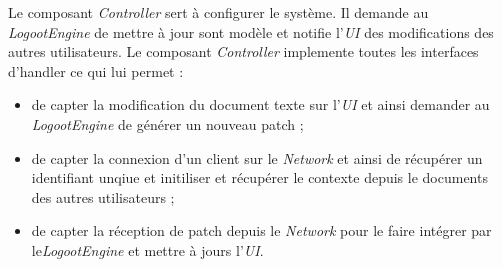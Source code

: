   Le composant \emph{Controller} sert à configurer le système. Il demande
  au \emph{LogootEngine} de mettre à jour sont modèle et notifie l'\emph{UI} des
  modifications des autres utilisateurs. Le composant \emph{Controller}
  implemente toutes les interfaces d'handler ce qui lui permet :
  \begin{itemize}
    \item de capter la modification du document texte sur l'\emph{UI} et ainsi
    demander au \emph{LogootEngine} de générer un nouveau patch ;
    \item de capter la connexion d'un client sur le \emph{Network} et ainsi de
    récupérer un identifiant unqiue et initiliser et récupérer le contexte
    depuis le documents des autres utilisateurs ;
    \item de capter la réception de patch depuis le \emph{Network} pour le
    faire intégrer par le\emph{LogootEngine} et mettre à jours l'\emph{UI}.
  \end{itemize}

